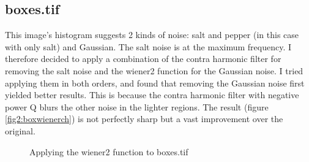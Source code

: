 \documentclass{article}
\begin{document}
\subsection*{boxes.tif}
This image's histogram suggests 2 kinds of noise: salt and pepper (in this case with only salt) and Gaussian. The salt noise is at the maximum frequency. I therefore decided to apply a combination of the contra harmonic filter for removing the salt noise and the wiener2 function for the Gaussian noise. I tried applying them in both orders, and found that removing the Gaussian noise first yielded better results. This is because the contra harmonic filter with negative power Q blurs the other noise in the lighter regions. The result (figure \ref{fig2:boxwienerch}) is not perfectly sharp but a vast improvement over the original.
\begin{figure}[h]
\qquad
{}\qquad
{}\qquad
\caption{Applying the wiener2 function to boxes.tif}
\label{q2:boxes}
\end{figure}
\end{document}

